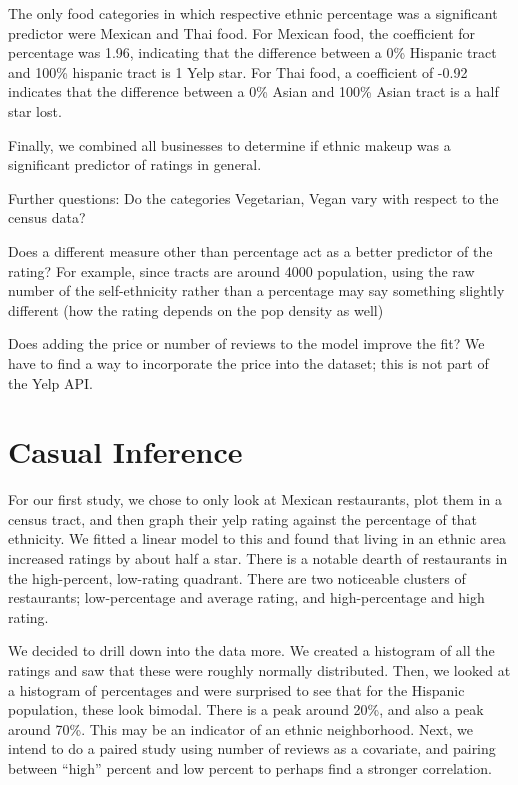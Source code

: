 \documentclass[11pt,twocolumn]{article}
\begin{document}
The only food categories in which respective ethnic percentage was a significant predictor were Mexican and Thai food. For Mexican food, the coefficient for percentage was 1.96, indicating that the difference between a 0\% Hispanic tract and 100\% hispanic tract is 1 Yelp star. For Thai food, a coefficient of -0.92 indicates that the difference between a 0\% Asian and 100\% Asian tract is a half star lost.

Finally, we combined all businesses to determine if ethnic makeup was a significant predictor of ratings in general. 




Further questions:
Do the categories Vegetarian, Vegan vary with respect to the census data?

Does a different measure other than percentage act as a better predictor of the rating? For example, since tracts are around 4000 population, using the raw number of the self-ethnicity rather than a percentage may say something slightly different (how the rating depends on the pop density as well)

Does adding the price or number of reviews to the model improve the fit? We have to find a way to incorporate the price into the dataset; this is not part of the Yelp API.

\section{Casual Inference}

For our first study, we chose to only look at Mexican restaurants, plot them in a census tract, and then graph their yelp rating against the percentage of that ethnicity. We fitted a linear model to this and found that living in an ethnic area increased ratings by about half a star. There is a notable dearth of restaurants in the high-percent, low-rating quadrant. There are two noticeable clusters of restaurants; low-percentage and average rating, and high-percentage and high rating.

We decided to drill down into the data more. We created a histogram of all the ratings and saw that these were roughly normally distributed. Then, we looked at a histogram of percentages and were surprised to see that for the Hispanic population, these look bimodal. There is a peak around 20\%, and also a peak around 70\%. This may be an indicator of an ethnic neighborhood. Next, we intend to do a paired study using number of reviews as a covariate, and pairing between “high” percent and low percent to perhaps find a stronger correlation.
\end{document}
